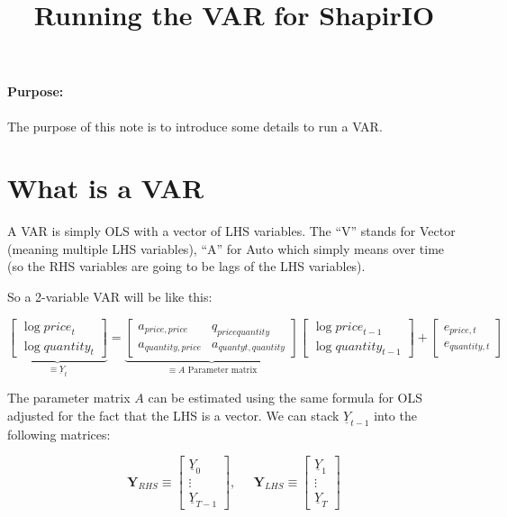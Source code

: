 \documentclass[12pt,english]{article}
\begin{document}


\title{Running the VAR for ShapirIO}
\maketitle

\paragraph{Purpose:} The purpose of this note is to introduce some details to run a VAR.

\section{What is a VAR}

A VAR is simply OLS with a vector of LHS variables. The ``V'' stands for Vector (meaning multiple LHS variables), ``A'' for Auto which simply means over time (so the RHS variables are going to be lags of the LHS variables).

So a 2-variable VAR will be like this:

\[
	\underbrace{\begin{bmatrix}
		\log{price}_{t}\\
		\log{quantity}_{t}
	\end{bmatrix}}_{\equiv \underbar{Y}_t}
	=
	\underbrace{\begin{bmatrix}
		a_{price,price} & q_{price quantity}\\
		a_{quantity,price}&a_{quantyt,quantity}
	\end{bmatrix}}_{\equiv A \text{ Parameter matrix}}
	\begin{bmatrix}
		\log{price}_{t-1}\\
		\log{quantity}_{t-1}
	\end{bmatrix}
	+\begin{bmatrix}
	e_{price,t}\\
	e_{quantity,t}
	\end{bmatrix}
\]

The parameter matrix $A$ can be estimated using the same formula for OLS adjusted for the fact that the LHS is a vector. We can stack $\underline{Y}_{t-1}$ into the following matrices:

\[
	\mathbf{Y}_{RHS}\equiv \begin{bmatrix}
		\underline{Y}_{0}\\
		\vdots\\
		\underline{Y}_{T-1}
	\end{bmatrix},\;\;\;\;\;\mathbf{Y}_{LHS}\equiv\begin{bmatrix}
		\underline{Y}_{1}\\
		\vdots\\
		\underline{Y}_{T}
	\end{bmatrix}
\]
\end{document}
